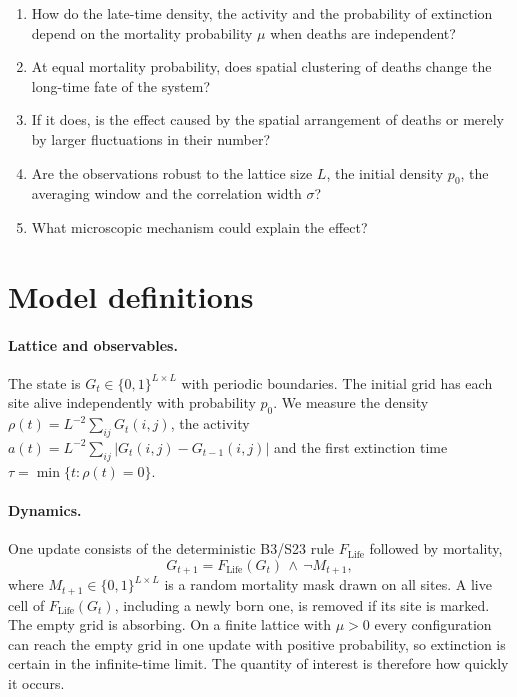 \documentclass[11pt,a4paper]{article}
\newcommand{\Life}{F_{\mathrm{Life}}}
\begin{document}
\begin{enumerate}
\item How do the late-time density, the activity and the probability of extinction depend on the mortality probability $\mu$ when deaths are independent?
\item At equal mortality probability, does spatial clustering of deaths change the long-time fate of the system?
\item If it does, is the effect caused by the spatial arrangement of deaths or merely by larger fluctuations in their number?
\item Are the observations robust to the lattice size $L$, the initial density $p_0$, the averaging window and the correlation width $\sigma$?
\item What microscopic mechanism could explain the effect?
\end{enumerate}

\section{Model definitions}

\paragraph{Lattice and observables.} The state is $G_t\in\{0,1\}^{L\times L}$ with periodic boundaries. The initial grid has each site alive independently with probability $p_0$. We measure the density $\rho(t)=L^{-2}\sum_{ij}G_t(i,j)$, the activity $a(t)=L^{-2}\sum_{ij}|G_t(i,j)-G_{t-1}(i,j)|$ and the first extinction time $\tau=\min\{t:\rho(t)=0\}$.

\paragraph{Dynamics.} One update consists of the deterministic B3/S23 rule $\Life$ followed by mortality,
\begin{equation}
G_{t+1}=\Life(G_t)\,\wedge\,\neg M_{t+1},
\end{equation}
where $M_{t+1}\in\{0,1\}^{L\times L}$ is a random mortality mask drawn on all sites. A live cell of $\Life(G_t)$, including a newly born one, is removed if its site is marked. The empty grid is absorbing. On a finite lattice with $\mu>0$ every configuration can reach the empty grid in one update with positive probability, so extinction is certain in the infinite-time limit. The quantity of interest is therefore how quickly it occurs.
\end{document}
